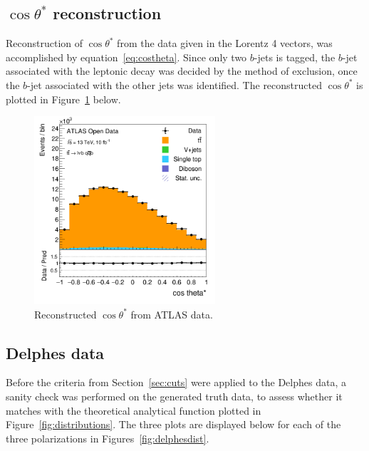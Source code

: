 \documentclass[12pt,a4paper]{article}
\numberwithin{equation}{section}
\begin{document}
\subsection{$\cos \theta^{*}$ reconstruction}
Reconstruction of $\cos \theta^{*}$ from the data given in the Lorentz 4 vectors, was
accomplished by equation~\eqref{eq:costheta}. Since only two $b$-jets is tagged,
the $b$-jet associated with the leptonic decay was decided by the method of
exclusion, once the $b$-jet associated with the other jets was identified. The
reconstructed $\cos \theta^{*}$ is plotted in Figure~\ref{fig:costhetaatlas} below.
\begin{figure}[H]
  \centering
  \includegraphics[width=0.6\textwidth]{figures/hist_costheta}
  \caption{\label{fig:costhetaatlas}Reconstructed $\cos \theta^{*}$ from ATLAS data.}
\end{figure}



\subsection{Delphes data}
Before the criteria from Section~\ref{sec:cuts} were applied to the Delphes
data, a sanity check was performed on the generated truth data, to assess
whether it matches with the theoretical analytical function plotted in
Figure~\ref{fig:distributions}. The three plots are displayed below for each of
the three polarizations in Figures~\ref{fig:delphesdist}.
\end{document}
